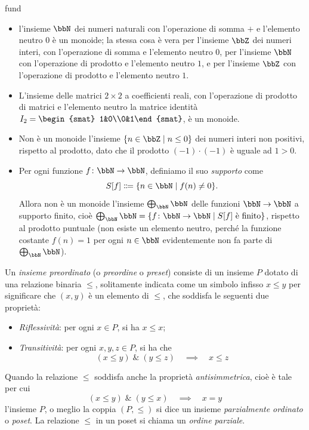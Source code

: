 \begin{hExamples}{fund}\leavevmode
 \begin{itemize}
  \item l'insieme	\(\bbN\) dei numeri naturali con l'operazione di somma \(+\) e l'elemento neutro \(0\) è un monoide; la stessa cosa è vera per l'insieme \(\bbZ\) dei numeri interi, con l'operazione di somma e l'elemento neutro \(0\), per l'insieme \(\bbN\) con l'operazione di prodotto e l'elemento neutro \(1\),	e per l'insieme \(\bbZ\) con l'operazione di prodotto e l'elemento neutro \(1\).
  \item L'insieme delle matrici \(2\times 2\) a coefficienti reali, con l'operazione di prodotto di matrici e l'elemento neutro la matrice identità \(I_2 = \begin{smat} 1&0\\0&1\end{smat}\), è un monoide.
  \item Non è un monoide l'insieme \(\{n\in\bbZ\mid n\le 0\}\) dei numeri interi non positivi, rispetto al prodotto, dato che il prodotto \((-1)\cdot(-1)\) è uguale ad \(1>0\).
  \item Per ogni funzione \(f \colon \bbN\to\bbN\), definiamo il suo \emph{supporto} come
        \[S[f] \defeq  \{n\in\bbN\mid f(n)\ne 0\}.\]
        Allora non è un monoide l'insieme \(\bigoplus_\bbN \bbN\) delle funzioni \(\bbN\to\bbN\) a supporto finito, cioè \(\bigoplus_\bbN \bbN=\{f \colon \bbN\to\bbN\mid S[f] \text{ è finito}\}\), rispetto al prodotto puntuale (non esiste un elemento neutro, perché la funzione costante \(f(n)=1\) per ogni \(n\in\bbN\) evidentemente non fa parte di \(\bigoplus_\bbN \bbN\)).
 \end{itemize}
\end{hExamples}
\begin{definition}\label{prelim_def_preset}
 Un \emph{insieme preordinato} (o \emph{preordine} o \emph{preset}) consiste di un insieme \(P\) dotato di una relazione binaria \(\le\), solitamente indicata come un simbolo infisso \(x\le y\) per significare che \((x,y)\) è un elemento di \(\le\), che soddisfa le seguenti due proprietà:
 \begin{itemize}
  \item \emph{Riflessività}: per ogni \(x\in P\), si ha \(x\le x\);
  \item \emph{Transitività}: per ogni \(x,y,z\in P\), si ha che
        \[(x\le y)\;\&\;(y\le z) \quad\implies\quad x\le z\]
 \end{itemize}
 Quando la relazione \(\le\) soddisfa anche la proprietà \emph{antisimmetrica}, cioè è tale per cui
 \[(x\le y)\;\&\;(y\le x) \quad\implies\quad x = y\]
 l'insieme \(P\), o meglio la coppia \((P,\le)\) si dice un insieme \emph{parzialmente ordinato} o \emph{poset}. La relazione \(\le\) in un poset si chiama un \emph{ordine parziale}.
\end{definition}
